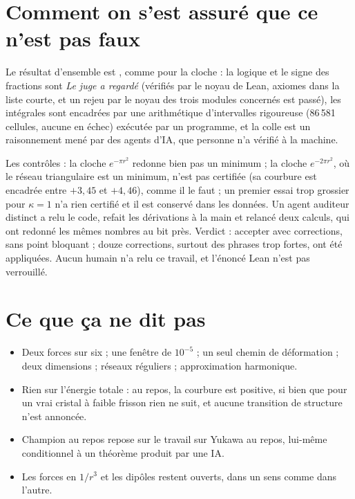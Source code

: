 \section*{Comment on s'est assuré que ce n'est pas faux}

Le résultat d'ensemble est , comme pour la cloche : la logique et le signe des
fractions sont  \emph{Le juge a regardé} (vérifiés par le noyau de Lean, axiomes dans la liste courte, et un
rejeu par le noyau des trois modules concernés est passé), les intégrales sont encadrées par une
arithmétique d'intervalles rigoureuse (86\,581 cellules, aucune en échec) exécutée par un
programme, et la colle est un raisonnement mené par des agents d'IA, que personne n'a vérifié à la machine.

Les contrôles : la cloche $e^{-\pi r^2}$ redonne bien \og pas un minimum\fg{} ; la cloche
$e^{-2\pi r^2}$, où le réseau triangulaire est un minimum, n'est pas certifiée (sa courbure est
encadrée entre $+3{,}45$ et $+4{,}46$), comme il le faut ; un premier essai trop grossier pour
$\kappa=1$ n'a rien certifié et il est conservé dans les données. Un agent auditeur distinct a
relu le code, refait les dérivations à la main et relancé deux calculs, qui ont redonné les mêmes
nombres au bit près. Verdict : \og accepter avec corrections\fg{}, sans point bloquant ; douze
corrections, surtout des phrases trop fortes, ont été appliquées. Aucun humain n'a relu ce
travail, et l'énoncé Lean n'est pas verrouillé.

\section*{Ce que ça ne dit pas}

\begin{limite}
\begin{itemize}
\item Deux forces sur six ; une fenêtre de $10^{-5}$ ; un seul chemin de déformation ; deux
  dimensions ; réseaux réguliers ; approximation harmonique.
\item Rien sur l'énergie totale : au repos, la courbure est positive, si bien que pour un vrai
  cristal à faible frisson rien ne suit, et aucune transition de structure n'est annoncée.
\item \og Champion au repos\fg{} repose sur le travail sur Yukawa au repos, lui-même conditionnel à un théorème
  produit par une IA.
\item Les forces en $1/r^3$ et les dipôles restent ouverts, dans un sens comme dans l'autre.
\end{itemize}
\end{limite}

